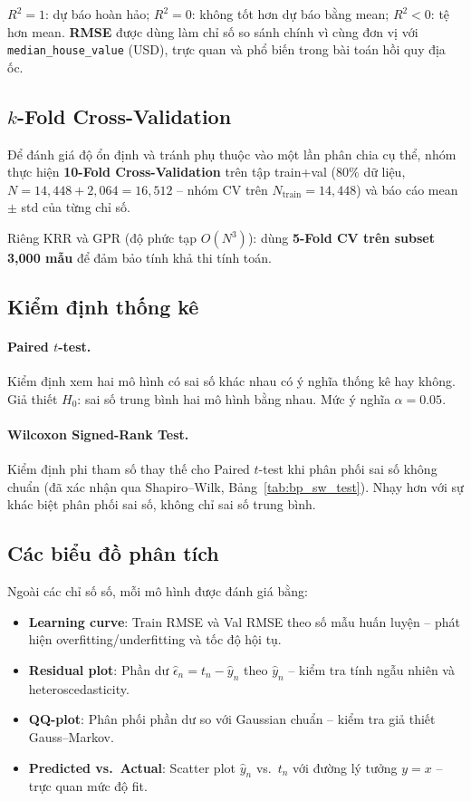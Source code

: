 \documentclass[12pt, a4paper]{article}
\begin{document}
\noindent $R^2 = 1$: dự báo hoàn hảo; $R^2 = 0$: không tốt hơn dự báo bằng mean;
$R^2 < 0$: tệ hơn mean. \textbf{RMSE} được dùng làm chỉ số so sánh chính
vì cùng đơn vị với \texttt{median\_house\_value} (USD), trực quan và
phổ biến trong bài toán hồi quy địa ốc.

\subsection{$k$-Fold Cross-Validation}

Để đánh giá độ ổn định và tránh phụ thuộc vào một lần phân chia cụ thể,
nhóm thực hiện \textbf{10-Fold Cross-Validation} trên tập train+val
($80\%$ dữ liệu, $N = 14{,}448 + 2{,}064 = 16{,}512$ -- nhóm CV trên
$N_{\text{train}} = 14{,}448$) và báo cáo mean $\pm$ std của từng chỉ số.

Riêng KRR và GPR (độ phức tạp $O(N^3)$): dùng \textbf{5-Fold CV trên
subset 3{,}000 mẫu} để đảm bảo tính khả thi tính toán.

\subsection{Kiểm định thống kê}

\paragraph{Paired $t$-test.}
Kiểm định xem hai mô hình có sai số khác nhau có ý nghĩa thống kê hay không.
Giả thiết $H_0$: sai số trung bình hai mô hình bằng nhau. Mức ý nghĩa
$\alpha = 0.05$.

\paragraph{Wilcoxon Signed-Rank Test.}
Kiểm định phi tham số thay thế cho Paired $t$-test khi phân phối sai số
không chuẩn (đã xác nhận qua Shapiro--Wilk, Bảng~\ref{tab:bp_sw_test}).
Nhạy hơn với sự khác biệt phân phối sai số, không chỉ sai số trung bình.

\subsection{Các biểu đồ phân tích}

Ngoài các chỉ số số, mỗi mô hình được đánh giá bằng:

\begin{itemize}
  \item \textbf{Learning curve}: Train RMSE và Val RMSE theo số mẫu huấn
        luyện -- phát hiện overfitting/underfitting và tốc độ hội tụ.
  \item \textbf{Residual plot}: Phần dư $\hat{\epsilon}_n = t_n - \hat{y}_n$
        theo $\hat{y}_n$ -- kiểm tra tính ngẫu nhiên và heteroscedasticity.
  \item \textbf{QQ-plot}: Phân phối phần dư so với Gaussian chuẩn --
        kiểm tra giả thiết Gauss--Markov.
  \item \textbf{Predicted vs.\ Actual}: Scatter plot $\hat{y}_n$ vs.\ $t_n$
        với đường lý tưởng $y = x$ -- trực quan mức độ fit.
\end{itemize}
\end{document}
